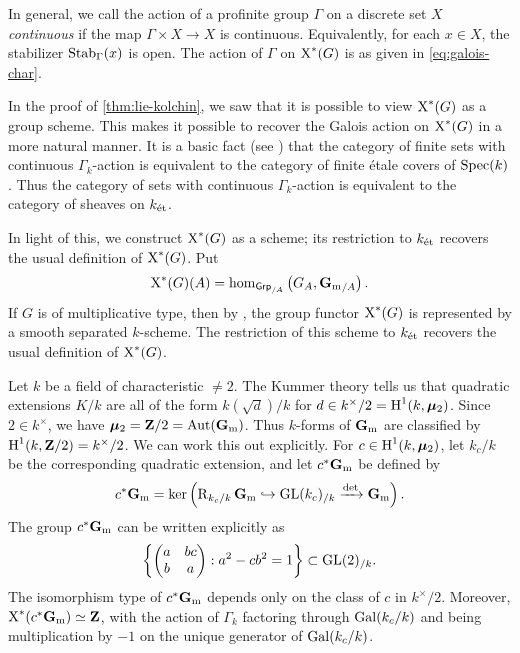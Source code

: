 In general, we call the action of a profinite group $\Gamma$ on a discrete 
set $X$ \emph{continuous} if the map $\Gamma\times X\to X$ is continuous. 
Equivalently, for each $x\in X$, the stabilizer $\operatorname{Stab}_\Gamma(x)$ is 
open. The action of $\Gamma$ on $\operatorname{X}^\ast(G)$ is as given in 
\eqref{eq:galois-char}. 

\begin{hard}
In the proof of \autoref{thm:lie-kolchin}, we saw that it is possible to 
view $\operatorname{X}^\ast(G)$ as a group scheme. This makes it possible to recover 
the Galois action on $\operatorname{X}^\ast(G)$ in a more natural manner. It is 
a basic fact (see \cite[V 8.1]{sga1}) that the category of finite sets with 
continuous $\Gamma_k$-action is equivalent to the category of finite \'etale 
covers of $\operatorname{Spec}(k)$. Thus the category of sets with continuous 
$\Gamma_k$-action is equivalent to the category of sheaves on $k_{\textnormal{\'et}}$. 

In light of this, we construct $\operatorname{X}^\ast(G)$ as a scheme; its 
restriction to $k_{\textnormal{\'et}}$ recovers the usual definition of 
$\operatorname{X}^\ast(G)$. Put 
\[
  \operatorname{X}^\ast(G)(A) = \hom_{\mathsf{Grp}_{/A}}\left(G_A,{\mathbf{G}_\mathrm{m}}_{/A}\right) .
\]
If $G$ is of multiplicative type, then by \cite[XI 4.2]{sga3-ii}, the 
group functor $\operatorname{X}^\ast(G)$ is represented by a smooth separated 
$k$-scheme. The restriction of this scheme to $k_{\textnormal{\'et}}$ recovers the 
usual definition of $\operatorname{X}^\ast(G)$. 
\end{hard}

\begin{example}
Let $k$ be a field of characteristic $\ne 2$. The Kummer theory tells us that 
quadratic extensions $K/k$ are all of the form $k(\sqrt d)/k$ for 
$d\in k^\times/2=\operatorname{H}^1(k,\bm{\mu}_2)$. Since $2\in k^\times$, we have 
$\bm{\mu}_2 = \mathbf{Z}/2 = \operatorname{Aut}(\mathbf{G}_\mathrm{m})$. Thus $k$-forms of $\mathbf{G}_\mathrm{m}$ are 
classified by $\operatorname{H}^1(k,\mathbf{Z}/2) = k^\times/2$. We can work this out 
explicitly. For $c\in \operatorname{H}^1(k,\bm{\mu}_2)$, let $k_c/k$ be the corresponding 
quadratic extension, and let $c^\ast\mathbf{G}_\mathrm{m}$ be defined by 
\[
  c^\ast \mathbf{G}_\mathrm{m} = \ker\left( \operatorname{R}_{k_c/k}\mathbf{G}_\mathrm{m} \hookrightarrow \operatorname{GL}(k_c)_{/k}\xrightarrow{\det} \mathbf{G}_\mathrm{m}\right) .
\]
The group $c^\ast\mathbf{G}_\mathrm{m}$ can be written explicitly as 
\[
  \left\{\begin{pmatrix} a & b c \\ b & a \end{pmatrix}:a^2 - c b^2=1\right\} \subset \operatorname{GL}(2)_{/k} .
\]
The isomorphism type of $c^\ast\mathbf{G}_\mathrm{m}$ depends only on the class of $c$ in 
$k^\times/2$. Moreover, $\operatorname{X}^\ast(c^\ast\mathbf{G}_\mathrm{m})\simeq \mathbf{Z}$, with the 
action of $\Gamma_k$ factoring through $\operatorname{Gal}(k_c/k)$ and being 
multiplication by $-1$ on the unique generator of $\operatorname{Gal}(k_c/k)$. 
\end{example}

